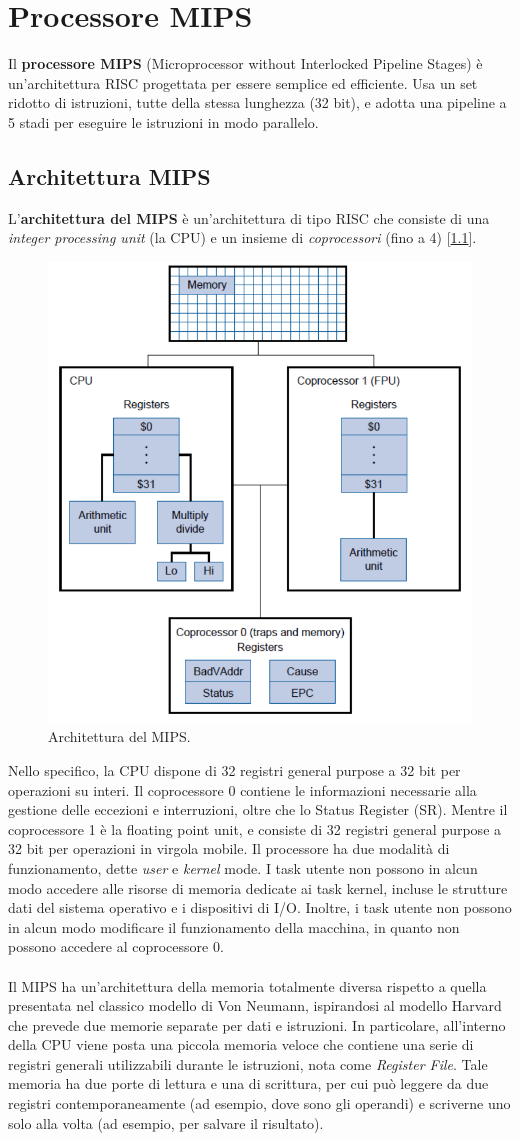 \chapter{Processore MIPS}
Il \textbf{processore MIPS} (Microprocessor without Interlocked Pipeline Stages) è un'architettura RISC progettata per essere semplice ed efficiente. Usa un set ridotto di istruzioni, tutte della stessa lunghezza (32 bit), e adotta una pipeline a 5 stadi per eseguire le istruzioni in modo parallelo.

\section{Architettura MIPS} \label{sec:mips}
L'\textbf{architettura del MIPS} è un'architettura di tipo RISC che consiste di una \textit{integer processing unit} (la CPU) e un insieme di \textit{coprocessori} (fino a 4) [\ref{fig:mips_arc}].
\begin{figure}[!h]
    \centering
    \includegraphics[width=0.45\linewidth]{img/mips.png}
    \caption{Architettura del MIPS.}
    \label{fig:mips_arc}
\end{figure}
Nello specifico, la CPU dispone di 32 registri general purpose a 32 bit per operazioni su interi. Il coprocessore 0 contiene le informazioni necessarie alla gestione delle eccezioni e interruzioni, oltre che lo Status Register (SR). Mentre il coprocessore 1 è la floating point unit, e consiste di 32 registri general purpose a 32 bit per operazioni in virgola mobile. Il processore ha due modalità di funzionamento, dette \textit{user} e \textit{kernel} mode. I task utente non possono in alcun modo accedere alle risorse di memoria dedicate ai task kernel, incluse le strutture dati del sistema operativo e i dispositivi di I/O. Inoltre, i task utente non possono in alcun modo modificare il funzionamento della macchina, in quanto non possono accedere al coprocessore 0.
\\
\\
Il MIPS ha un'architettura della memoria totalmente diversa rispetto a quella presentata nel classico modello di Von Neumann, ispirandosi al modello Harvard che prevede due memorie separate per dati e istruzioni. In particolare, all'interno della CPU viene posta una piccola memoria veloce che contiene una serie di registri generali utilizzabili durante le istruzioni, nota come \textit{Register File}. Tale memoria ha due porte di lettura e una di scrittura, per cui può leggere da due registri contemporaneamente (ad esempio, dove sono gli operandi) e scriverne uno solo alla volta (ad esempio, per salvare il risultato).


